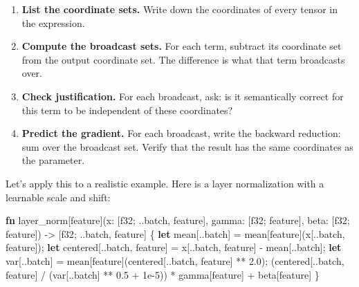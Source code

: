 \documentclass[11pt,titlepage]{article}
\newenvironment{Shaded}{}{}
\newcommand{\DataTypeTok}[1]{\textcolor[rgb]{0.56,0.13,0.00}{#1}}
\newcommand{\DecValTok}[1]{\textcolor[rgb]{0.25,0.63,0.44}{#1}}
\newcommand{\KeywordTok}[1]{\textcolor[rgb]{0.00,0.44,0.13}{\textbf{#1}}}
\newcommand{\NormalTok}[1]{#1}
\newcommand{\OperatorTok}[1]{\textcolor[rgb]{0.40,0.40,0.40}{#1}}
\begin{document}
\begin{enumerate}
\def\labelenumi{\arabic{enumi}.}
\item
  \textbf{List the coordinate sets.} Write down the coordinates of every
  tensor in the expression.
\item
  \textbf{Compute the broadcast sets.} For each term, subtract its
  coordinate set from the output coordinate set. The difference is what
  that term broadcasts over.
\item
  \textbf{Check justification.} For each broadcast, ask: is it
  semantically correct for this term to be independent of these
  coordinates?
\item
  \textbf{Predict the gradient.} For each broadcast, write the backward
  reduction: sum over the broadcast set. Verify that the result has the
  same coordinates as the parameter.
\end{enumerate}

Let's apply this to a realistic example. Here is a layer normalization
with a learnable scale and shift:

\begin{Shaded}
\begin{Highlighting}[]
\KeywordTok{fn}\NormalTok{ layer_norm[feature](x: }\OperatorTok{[}\DataTypeTok{f32}\NormalTok{; ..batch, feature}\OperatorTok{]}\NormalTok{,}
\NormalTok{                        gamma: }\OperatorTok{[}\DataTypeTok{f32}\NormalTok{; feature}\OperatorTok{]}\NormalTok{,}
\NormalTok{                        beta: }\OperatorTok{[}\DataTypeTok{f32}\NormalTok{; feature}\OperatorTok{]}\NormalTok{)}
\NormalTok{    -> }\OperatorTok{[}\DataTypeTok{f32}\NormalTok{; ..batch, feature}\OperatorTok{]}
\OperatorTok{\{}
    \KeywordTok{let}\NormalTok{ mean}\OperatorTok{[}\NormalTok{..batch}\OperatorTok{]}\NormalTok{ = mean}\OperatorTok{[}\NormalTok{feature}\OperatorTok{]}\NormalTok{(x}\OperatorTok{[}\NormalTok{..batch, feature}\OperatorTok{]}\NormalTok{);}
    \KeywordTok{let}\NormalTok{ centered}\OperatorTok{[}\NormalTok{..batch, feature}\OperatorTok{]}\NormalTok{ = x}\OperatorTok{[}\NormalTok{..batch, feature}\OperatorTok{]}\NormalTok{ - mean}\OperatorTok{[}\NormalTok{..batch}\OperatorTok{]}\NormalTok{;}
    \KeywordTok{let}\NormalTok{ var}\OperatorTok{[}\NormalTok{..batch}\OperatorTok{]}\NormalTok{ = mean}\OperatorTok{[}\NormalTok{feature}\OperatorTok{]}\NormalTok{(centered}\OperatorTok{[}\NormalTok{..batch, feature}\OperatorTok{]}\NormalTok{ ** }\DecValTok{2.0}\NormalTok{);}
\NormalTok{    (centered}\OperatorTok{[}\NormalTok{..batch, feature}\OperatorTok{]}\NormalTok{ / (var}\OperatorTok{[}\NormalTok{..batch}\OperatorTok{]}\NormalTok{ ** }\DecValTok{0.5}\NormalTok{ + }\DecValTok{1}\NormalTok{e-}\DecValTok{5}\NormalTok{)) * gamma}\OperatorTok{[}\NormalTok{feature}\OperatorTok{]}\NormalTok{ + beta}\OperatorTok{[}\NormalTok{feature}\OperatorTok{]}
\OperatorTok{\}}
\end{Highlighting}
\end{Shaded}
\end{document}
